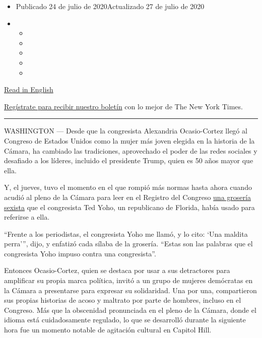 \begin{itemize}
\item
  Publicado 24 de julio de 2020Actualizado 27 de julio de 2020
\item
  \begin{itemize}
  \item
  \item
  \item
  \item
  \item
  \end{itemize}
\end{itemize}

\href{https://www.nytimes.com/2020/07/23/us/alexandria-ocasio-cortez-sexism-congress.html}{Read
in English}

\href{https://www.nytimes.com/newsletters/el-times}{Regístrate para
recibir nuestro boletín} con lo mejor de The New York Times.

\begin{center}\rule{0.5\linewidth}{\linethickness}\end{center}

WASHINGTON --- Desde que la congresista Alexandria Ocasio-Cortez llegó
al Congreso de Estados Unidos como la mujer más joven elegida en la
historia de la Cámara, ha cambiado las tradiciones, aprovechado el poder
de las redes sociales y desafiado a los líderes, incluido el presidente
Trump, quien es 50 años mayor que ella.

Y, el jueves, tuvo el momento en el que rompió más normas hasta ahora
cuando acudió al pleno de la Cámara para leer en el Registro del
Congreso
\href{https://www.nytimes.com/2020/07/23/us/politics/aoc-women-ted-yoho.html}{una
grosería sexista} que el congresista Ted Yoho, un republicano de
Florida, había usado para referirse a ella.

``Frente a los periodistas, el congresista Yoho me llamó, y lo cito:
`Una maldita perra''', dijo, y enfatizó cada sílaba de la grosería.
``Estas son las palabras que el congresista Yoho impuso contra una
congresista''.

Entonces Ocasio-Cortez, quien se destaca por usar a sus detractores para
amplificar su propia marca política, invitó a un grupo de mujeres
demócratas en la Cámara a presentarse para expresar su solidaridad. Una
por una, compartieron sus propias historias de acoso y maltrato por
parte de hombres, incluso en el Congreso. Más que la obscenidad
pronunciada en el pleno de la Cámara, donde el idioma está
cuidadosamente regulado, lo que se desarrolló durante la siguiente hora
fue un momento notable de agitación cultural en Capitol Hill.

